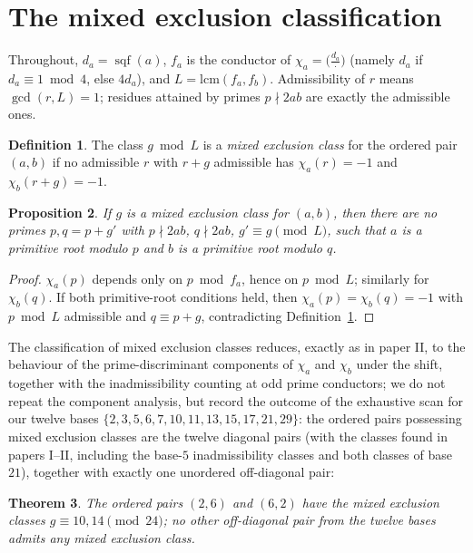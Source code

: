 \documentclass[11pt,reqno]{amsart}
\theoremstyle{plain}
\newtheorem{theorem}{Theorem}
\newtheorem{proposition}[theorem]{Proposition}
\theoremstyle{definition}
\newtheorem{definition}[theorem]{Definition}
\DeclareMathOperator{\sqf}{sqf}
\begin{document}
\section{The mixed exclusion classification}
\label{sec:theory}

Throughout, $d_a = \sqf(a)$, $f_a$ is the conductor of
$\chi_a = \bigl(\tfrac{d_a}{\cdot}\bigr)$ (namely $d_a$ if
$d_a \equiv 1 \bmod 4$, else $4 d_a$), and $L = \mathrm{lcm}(f_a, f_b)$.
Admissibility of $r$ means $\gcd(r, L) = 1$; residues attained by primes
$p \nmid 2ab$ are exactly the admissible ones.

\begin{definition}
\label{def:mixed}
The class $g \bmod L$ is a \emph{mixed exclusion class} for the ordered pair
$(a, b)$ if no admissible $r$ with $r + g$ admissible has
$\chi_a(r) = -1$ and $\chi_b(r + g) = -1$.
\end{definition}

\begin{proposition}
\label{prop:mixedlaw}
If $g$ is a mixed exclusion class for $(a, b)$, then there are no primes
$p, q = p + g'$ with $p \nmid 2ab$, $q \nmid 2ab$, $g' \equiv g \pmod L$,
such that $a$ is a primitive root modulo $p$ and $b$ is a primitive root
modulo $q$.
\end{proposition}

\begin{proof}
$\chi_a(p)$ depends only on $p \bmod f_a$, hence on $p \bmod L$; similarly
for $\chi_b(q)$. If both primitive-root conditions held, then
$\chi_a(p) = \chi_b(q) = -1$ with $p \bmod L$ admissible and
$q \equiv p + g$, contradicting Definition~\ref{def:mixed}.
\end{proof}

The classification of mixed exclusion classes reduces, exactly as in paper
II, to the behaviour of the prime-discriminant components of $\chi_a$ and
$\chi_b$ under the shift, together with the inadmissibility counting at odd
prime conductors; we do not repeat the component analysis, but record the
outcome of the exhaustive scan for our twelve bases
$\{2, 3, 5, 6, 7, 10, 11, 13, 15, 17, 21, 29\}$: the ordered pairs
possessing mixed exclusion classes are the twelve diagonal pairs (with the
classes found in papers I--II, including the base-$5$ inadmissibility classes
and both classes of base $21$), together with exactly one unordered
off-diagonal pair:

\begin{theorem}
\label{thm:mixed26}
The ordered pairs $(2, 6)$ and $(6, 2)$ have the mixed exclusion classes
$g \equiv 10, 14 \pmod{24}$; no other off-diagonal pair from the twelve bases
admits any mixed exclusion class.
\end{theorem}
\end{document}
